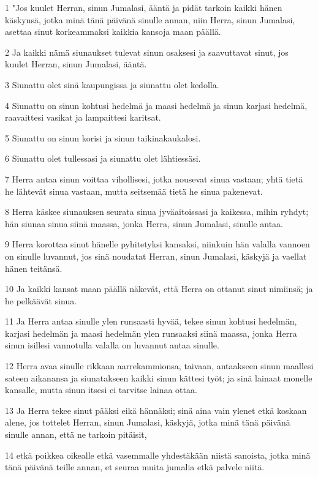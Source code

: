 \par 1 "Jos kuulet Herran, sinun Jumalasi, ääntä ja pidät tarkoin kaikki hänen käskynsä, jotka minä tänä päivänä sinulle annan, niin Herra, sinun Jumalasi, asettaa sinut korkeammaksi kaikkia kansoja maan päällä.
\par 2 Ja kaikki nämä siunaukset tulevat sinun osaksesi ja saavuttavat sinut, jos kuulet Herran, sinun Jumalasi, ääntä.
\par 3 Siunattu olet sinä kaupungissa ja siunattu olet kedolla.
\par 4 Siunattu on sinun kohtusi hedelmä ja maasi hedelmä ja sinun karjasi hedelmä, raavaittesi vasikat ja lampaittesi karitsat.
\par 5 Siunattu on sinun korisi ja sinun taikinakaukalosi.
\par 6 Siunattu olet tullessasi ja siunattu olet lähtiessäsi.
\par 7 Herra antaa sinun voittaa vihollisesi, jotka nousevat sinua vastaan; yhtä tietä he lähtevät sinua vastaan, mutta seitsemää tietä he sinua pakenevat.
\par 8 Herra käskee siunauksen seurata sinua jyväaitoissasi ja kaikessa, mihin ryhdyt; hän siunaa sinua siinä maassa, jonka Herra, sinun Jumalasi, sinulle antaa.
\par 9 Herra korottaa sinut hänelle pyhitetyksi kansaksi, niinkuin hän valalla vannoen on sinulle luvannut, jos sinä noudatat Herran, sinun Jumalasi, käskyjä ja vaellat hänen teitänsä.
\par 10 Ja kaikki kansat maan päällä näkevät, että Herra on ottanut sinut nimiinsä; ja he pelkäävät sinua.
\par 11 Ja Herra antaa sinulle ylen runsaasti hyvää, tekee sinun kohtusi hedelmän, karjasi hedelmän ja maasi hedelmän ylen runsaaksi siinä maassa, jonka Herra sinun isillesi vannotulla valalla on luvannut antaa sinulle.
\par 12 Herra avaa sinulle rikkaan aarrekammionsa, taivaan, antaakseen sinun maallesi sateen aikanansa ja siunatakseen kaikki sinun kättesi työt; ja sinä lainaat monelle kansalle, mutta sinun itsesi ei tarvitse lainaa ottaa.
\par 13 Ja Herra tekee sinut pääksi eikä hännäksi; sinä aina vain ylenet etkä koskaan alene, jos tottelet Herran, sinun Jumalasi, käskyjä, jotka minä tänä päivänä sinulle annan, että ne tarkoin pitäisit,
\par 14 etkä poikkea oikealle etkä vasemmalle yhdestäkään niistä sanoista, jotka minä tänä päivänä teille annan, et seuraa muita jumalia etkä palvele niitä.
